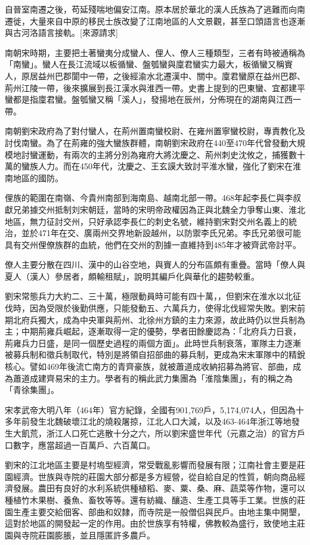 自晉室南遷之後，苟延殘喘地偏安江南。原本居於華北的漢人氏族為了逃難而向南遷徙，大量來自中原的移民士族改變了江南地區的人文景觀，甚至口頭語言也逐漸與古河洛語言接軌。[來源請求]

南朝宋時期，主要把土著蠻夷分成蠻人、俚人、僚人三種類型，三者有時被通稱為「南蠻」。蠻人在長江流域以板循蠻、盤瓠蠻與廩君蠻实力最大，板循蠻又稱賨人，原居益州巴郡閬中一帶，之後經渝水北遷漢中、關中。廩君蠻原在益州巴郡、荊州江陵一帶，後來擴展到長江漢水與淮西一帶。史書上提到的巴東蠻、宜都建平蠻都是指廩君蠻。盤瓠蠻又稱「溪人」，發揚地在辰州，分佈現在的湖南與江西一帶。

南朝劉宋政府為了對付蠻人，在荊州置南蠻校尉、在雍州置寧蠻校尉，專責教化及討伐南蠻。為了在荊雍的強大蠻族群體，南朝劉宋政府在440至470年代曾發動大規模地討蠻運動，有兩次的主將分別為雍府大將沈慶之、荊州刺史沈攸之，捕獲數十萬的蠻族人力。而在450年代，沈慶之、王玄謨大致討平淮水蠻，強化了劉宋在淮南地區的國防。

俚族的範圍在南嶺、今貴州南部到海南島、越南北部一帶。468年起李長仁與李叔獻兄弟據交州抵制刘宋朝廷，當時的宋明帝政權因為正與北魏全力爭奪山東、淮北地區，無力征討交州，只好承認李長仁的刺史名號，維持劉宋對交州名義上的統治，並於471年在交、廣兩州交界地新設越州，以防禦李氏兄弟。李氏兄弟很可能具有交州俚僚族群的血統，他們在交州的割據一直維持到485年才被齊武帝討平。

僚人主要分散在四川、漢中的山谷空地，與賨人的分布區頗有重疊。當時「僚人與夏人（漢人）參居者，頗輸租賦」，說明其編戶化與華化的趨勢較重。

劉宋常態兵力大約二、三十萬，極限動員時可能有四十萬，，但劉宋在淮水以北征伐時，因為受限於後勤供應，只能發動五、六萬兵力，使得北伐經常失敗。劉宋前期北府兵獨大，成為中央軍與荊州、北徐州方鎮的主力來源，故此時仍以世兵制為主；中期荊雍兵崛起，逐漸取得一定的優勢，學者田餘慶認為：「北府兵力日衰，荊雍兵力日盛，是同一個歷史過程的兩個方面」。此時世兵制衰落，軍隊主力逐漸被募兵制和徵兵制取代，特別是將領自招部曲的募兵制，更成為宋末軍隊中的精銳核心。譬如469年後流亡南方的青齊豪族，就被蕭道成收納招募為將官、部曲，成為蕭道成建齊易宋的主力。學者有的稱此武力集團為「淮陰集團」，有的稱之為「青徐集團」。

宋孝武帝大明八年（464年）官方紀錄，全國有901,769戶，5,174,074人，但因為十多年前發生北魏破壞江北的燒殺屠掠，江北人口大減，以及463-464年浙江等地發生大飢荒，浙江人口死亡逃散十分之六，所以劉宋盛世年代（元嘉之治）的官方戶口數字，應當超過一百萬戶、六百萬口。

劉宋的江北地區主要是村塢型經濟，常受戰亂影響而發展有限；江南社會主要是莊園經濟。世族與寺院的莊園大部分都是多方經營，從自給自足的性質，朝向商品經濟發展。農田有良好的水利系統供種植稻、麥、粟、桑、麻、蔬菜等作物，還可以種植竹木果樹、養魚、畜牧等等。還有紡織、釀造、生產工具等手工業。世族的莊園生產主要交給佃客、部曲和奴隸，而寺院是一般僧侣與民戶。由地主集中開墾，這對於地區的開發起一定的作用。由於世族享有特權，佛教較為盛行，致使地主莊園與寺院莊園膨脹，並且隱匿許多農戶。

